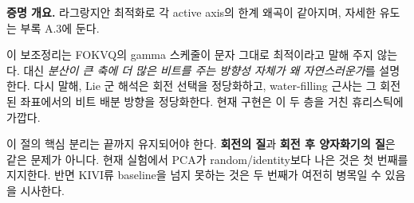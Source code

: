 \begin{theorycomment}
\textbf{증명 개요.} 라그랑지안 최적화로 각 active axis의 한계 왜곡이 같아지며, 자세한 유도는 부록 A.3에 둔다.
\end{theorycomment}

이 보조정리는 FOKVQ의 gamma 스케줄이 문자 그대로 최적이라고 말해 주지 않는다. 대신 \emph{분산이 큰 축에 더 많은 비트를 주는 방향성 자체가 왜 자연스러운가}를 설명한다. 다시 말해, Lie 군 해석은 회전 선택을 정당화하고, water-filling 근사는 그 회전된 좌표에서의 비트 배분 방향을 정당화한다. 현재 구현은 이 두 층을 거친 휴리스틱에 가깝다.

\begin{remark}
이 절의 핵심 분리는 끝까지 유지되어야 한다. \textbf{회전의 질}과 \textbf{회전 후 양자화기의 질}은 같은 문제가 아니다. 현재 실험에서 PCA가 random/identity보다 나은 것은 첫 번째를 지지한다. 반면 KIVI류 baseline을 넘지 못하는 것은 두 번째가 여전히 병목일 수 있음을 시사한다.
\end{remark}

